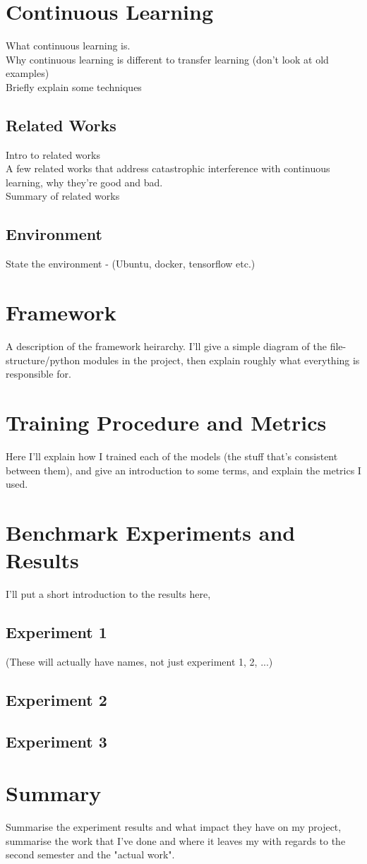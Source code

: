 \documentclass{report}
\begin{document}
	\section{Continuous Learning}
	What continuous learning is. \\
	Why continuous learning is different to transfer learning (don't look at old examples) \\
	Briefly explain some techniques \\

	\subsection{Related Works}
	Intro to related works \\
	A few related works that address catastrophic interference	with continuous learning, why they're good and bad. \\
	Summary of related works \\

	\subsection{Environment}
	State the environment - (Ubuntu, docker, tensorflow etc.)
	
	\section{Framework}
	A description of the framework heirarchy. I'll give a simple diagram of the file-structure/python modules in the project, then explain roughly what everything is responsible for.
	
	\section{Training Procedure and Metrics}
	Here I'll explain how I trained each of the models (the stuff that's consistent between them), and give an introduction to some terms, and explain the metrics I used.
	
	\section{Benchmark Experiments and Results}
	I'll put a short introduction to the results here,
	
	\subsection{Experiment 1}
	(These will actually have names, not just experiment 1, 2, ...)
	\subsection{Experiment 2}
	\subsection{Experiment 3}
		
	\section{Summary}
	Summarise the experiment results and what impact they have on my project, summarise the work that I've done and where it leaves my with regards to the second semester and the "actual work". 
	
	
\end{document}
